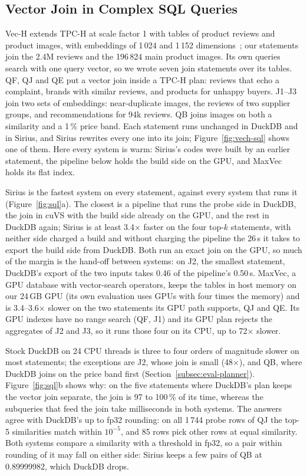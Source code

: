\subsection{Vector Join in Complex SQL Queries}\label{subsec:eval-sql}




Vec-H extends TPC-H at scale factor 1 with tables of product reviews and product images, with embeddings of 1\,024 and 1\,152 dimensions~\cite{MaxVec26}; our statements join the 2.4M reviews and the 196\,824 main product images.
Its own queries search with one query vector, so we wrote seven join statements over its tables.
QF, QJ and QE put a vector join inside a TPC-H plan: reviews that echo a complaint, brands with similar reviews, and products for unhappy buyers.
J1--J3 join two sets of embeddings: near-duplicate images, the reviews of two supplier groups, and recommendations for 94k reviews.
QB joins images on both a similarity and a 1\,\% price band.
Each statement runs unchanged in DuckDB and in Sirius, and Sirius rewrites every one into its join; Figure~\ref{fig:vech-sql} shows one of them.
Here every system is warm: Sirius's codes were built by an earlier statement, the pipeline below holds the build side on the GPU, and MaxVec holds its flat index.

Sirius is the fastest system on every statement, against every system that runs it (Figure~\ref{fig:sql}a).
The closest is a pipeline that runs the probe side in DuckDB, the join in cuVS with the build side already on the GPU, and the rest in DuckDB again; Sirius is at least 3.4$\times$ faster on the four top-$k$ statements, with neither side charged a build and without charging the pipeline the 26\,s it takes to export the build side from DuckDB.
Both run an exact join on the GPU, so much of the margin is the hand-off between systems: on J2, the smallest statement, DuckDB's export of the two inputs takes 0.46 of the pipeline's 0.50\,s.
MaxVec, a GPU database with vector-search operators, keeps the tables in host memory on our 24\,GB GPU (its own evaluation uses GPUs with four times the memory) and is 3.4--3.6$\times$ slower on the two statements its GPU path supports, QJ and QE.
Its GPU indexes have no range search (QF, J1) and its GPU plan rejects the aggregates of J2 and J3, so it runs those four on its CPU, up to 72$\times$ slower.

Stock DuckDB on 24 CPU threads is three to four orders of magnitude slower on most statements; the exceptions are J2, whose join is small (48$\times$), and QB, where DuckDB joins on the price band first (Section~\ref{subsec:eval-planner}).
Figure~\ref{fig:sql}b shows why: on the five statements where DuckDB's plan keeps the vector join separate, the join is 97 to 100\,\% of its time, whereas the subqueries that feed the join take milliseconds in both systems.
The answers agree with DuckDB's up to fp32 rounding: on all 1\,744 probe rows of QJ the top-5 similarities match within $10^{-5}$, and 85 rows pick other rows at equal similarity.
Both systems compare a similarity with a threshold in fp32, so a pair within rounding of it may fall on either side: Sirius keeps a few pairs of QB at 0.89999982, which DuckDB drops.

